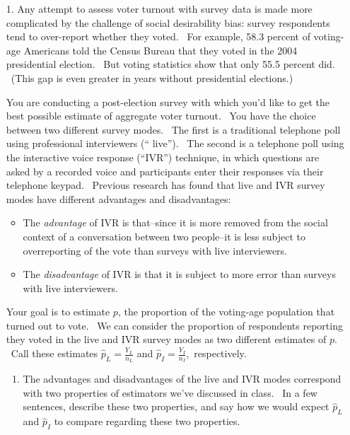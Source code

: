 \documentclass[11pt]{article}
\begin{document}
\begin{enumerate}
\item[1.] Any attempt to assess voter turnout with survey data is made more
complicated by the challenge of social desirability bias: survey respondents
tend to over-report whether they voted. \ For example, 58.3 percent of
voting-age Americans told the Census Bureau that they voted in the 2004
presidential election. \ But voting statistics show that only 55.5 percent
did. \ (This gap is even greater in years without presidential elections.)

You are conducting a post-election survey with which you'd like to get the
best possible estimate of aggregate voter turnout. \ You have the choice
between two different survey modes. \ The first is a traditional telephone
poll using professional interviewers (\textquotedblleft
live\textquotedblright ). \ The second is a telephone poll using the
interactive voice response (\textquotedblleft IVR\textquotedblright )
technique, in which questions are asked by a recorded voice and participants
enter their responses via their telephone keypad. \ Previous research has
found that live and IVR survey modes have different advantages and
disadvantages:

\begin{itemize}
\item The \textit{advantage }of IVR is that--since it is more removed from
the social context of a conversation between two people--it is less subject
to overreporting of the vote than surveys with live interviewers. \ 

\item The \textit{disadvantage }of IVR is that it is subject to more error
than surveys with live interviewers.
\end{itemize}

Your goal is to estimate $p$, the proportion of the voting-age population
that turned out to vote. \ We can consider the proportion of respondents
reporting they voted in the live and IVR survey modes as two different
estimates of $p.$ \ Call these estimates $\widehat{p}_{L}=\frac{Y_{L}}{n_{L}}
$ and $\widehat{p}_{I}=\frac{Y_{I}}{n_{I}},$ respectively.

\begin{enumerate}
\item The advantages and disadvantages of the live and IVR modes correspond
with two properties of estimators we've discussed in class. \ In a few
sentences, describe these two properties, and say how we would expect $%
\widehat{p}_{L}$ and $\widehat{p}_{I}$ to compare regarding these two
properties.\medskip


\end{enumerate}
\end{enumerate}
\end{document}
